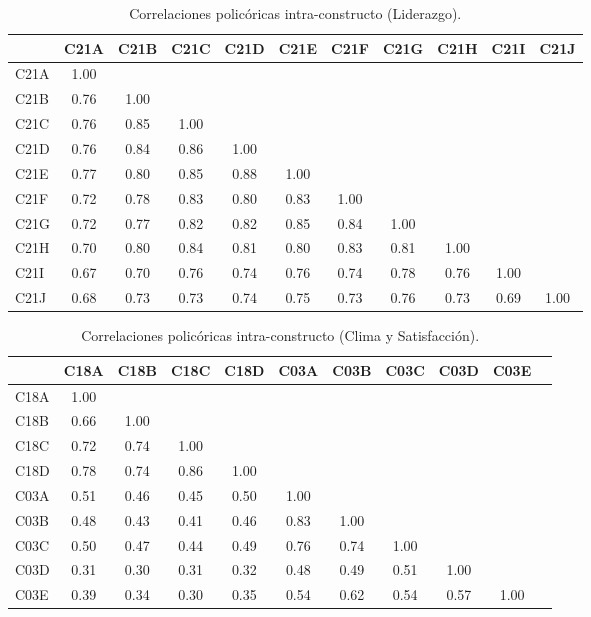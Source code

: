\documentclass[11pt, a4paper]{article} %
\begin{document}
\begin{table}[H]
\centering
\footnotesize
\caption{Correlaciones policóricas intra-constructo (Liderazgo).}
\begin{tabular}{l|cccccccccc}
\toprule
 & C21A & C21B & C21C & C21D & C21E & C21F & C21G & C21H & C21I & C21J \\
\midrule
C21A & 1.00 & & & & & & & & & \\
C21B & 0.76 & 1.00 & & & & & & & & \\
C21C & 0.76 & 0.85 & 1.00 & & & & & & & \\
C21D & 0.76 & 0.84 & 0.86 & 1.00 & & & & & & \\
C21E & 0.77 & 0.80 & 0.85 & 0.88 & 1.00 & & & & & \\
C21F & 0.72 & 0.78 & 0.83 & 0.80 & 0.83 & 1.00 & & & & \\
C21G & 0.72 & 0.77 & 0.82 & 0.82 & 0.85 & 0.84 & 1.00 & & & \\
C21H & 0.70 & 0.80 & 0.84 & 0.81 & 0.80 & 0.83 & 0.81 & 1.00 & & \\
C21I & 0.67 & 0.70 & 0.76 & 0.74 & 0.76 & 0.74 & 0.78 & 0.76 & 1.00 & \\
C21J & 0.68 & 0.73 & 0.73 & 0.74 & 0.75 & 0.73 & 0.76 & 0.73 & 0.69 & 1.00 \\
\bottomrule
\end{tabular}
\end{table}

\begin{table}[H]
\centering
\footnotesize
\caption{Correlaciones policóricas intra-constructo (Clima y Satisfacción).}
\begin{tabular}{l|cccc|cccccc}
\toprule
 & C18A & C18B & C18C & C18D & C03A & C03B & C03C & C03D & C03E \\
\midrule
C18A & 1.00 & & & & & & & & \\
C18B & 0.66 & 1.00 & & & & & & & \\
C18C & 0.72 & 0.74 & 1.00 & & & & & & \\
C18D & 0.78 & 0.74 & 0.86 & 1.00 & & & & & \\
\midrule
C03A & 0.51 & 0.46 & 0.45 & 0.50 & 1.00 & & & & \\
C03B & 0.48 & 0.43 & 0.41 & 0.46 & 0.83 & 1.00 & & & \\
C03C & 0.50 & 0.47 & 0.44 & 0.49 & 0.76 & 0.74 & 1.00 & & \\
C03D & 0.31 & 0.30 & 0.31 & 0.32 & 0.48 & 0.49 & 0.51 & 1.00 & \\
C03E & 0.39 & 0.34 & 0.30 & 0.35 & 0.54 & 0.62 & 0.54 & 0.57 & 1.00 \\
\bottomrule
\end{tabular}
\end{table}
\end{document}
